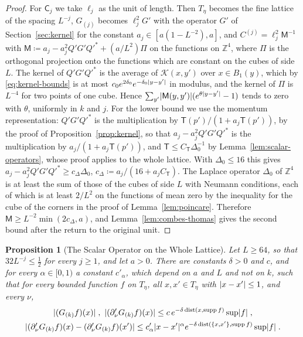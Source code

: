 \documentclass[11pt]{preprint}
\newcommand{\dist}{\operatorname{dist}}
\DeclarePairedDelimiter{\abs}{\lvert}{\rvert}
\numberwithin{equation}{section}
\newtheorem{proposition}[theorem]{Proposition}
\theoremstyle{definition}
\theoremstyle{remark}
\theoremstyle{plain}
\begin{document}
\begin{proof}
For $\mathsf C_j$ we take $\ell_j$ as the unit of length. Then $T_\eta$ becomes the fine lattice of the spacing $L^{-j}$, $G_{(j)}$ becomes $\ell_j^2G'$ with the operator $G'$ of Section~\ref{sec:kernel} for the constant $a_j \in [a(1 - L^{-2}), a]$, and $C^{(j)} = \ell_j^2\mathsf M^{-1}$ with $\mathsf M \coloneqq a_j - a_j^2Q'G'Q'^* + (a/L^2)\Pi$ on the functions on $\mathbb Z^4$, where $\Pi$ is the orthogonal projection onto the functions which are constant on the cubes of side $L$. The kernel of $Q'G'Q'^*$ is the average of $\mathcal K(x, y')$ over $x \in B_1(y)$, which by \eqref{eq:kernel-bounds} is at most $c_0e^{2\delta_0}e^{-\delta_0\abs{y - y'}}$ in modulus, and the kernel of $\Pi$ is $L^{-4}$ for two points of one cube. Hence $\sum_{y'}\abs{\mathsf M(y, y')}(e^{\theta\abs{y - y'}} - 1)$ tends to zero with $\theta$, uniformly in $k$ and $j$. For the lower bound we use the momentum representation: $Q'G'Q'^*$ is the multiplication by $\mathsf T(p')/(1 + a_j\mathsf T(p'))$, by the proof of Proposition~\ref{prop:kernel}, so that $a_j - a_j^2Q'G'Q'^*$ is the multiplication by $a_j/(1 + a_j\mathsf T(p'))$, and $\mathsf T \leq C_{\mathsf T}\Delta_0^{-1}$ by Lemma~\ref{lem:scalar-operators}, whose proof applies to the whole lattice. With $\Delta_0 \leq 16$ this gives $a_j - a_j^2Q'G'Q'^* \geq c_\Delta\Delta_0$, $c_\Delta \coloneqq a_j/(16 + a_jC_{\mathsf T})$. The Laplace operator $\Delta_0$ of $\mathbb Z^4$ is at least the sum of those of the cubes of side $L$ with Neumann conditions, each of which is at least $2/L^2$ on the functions of mean zero by the inequality for the cube of the corners in the proof of Lemma~\ref{lem:poincare}. Therefore $\mathsf M \geq L^{-2}\min(2c_\Delta, a)$, and Lemma~\ref{lem:combes-thomas} gives the second bound after the return to the original unit.
\end{proof}

\begin{proposition}[The Scalar Operator on the Whole Lattice]\label{prop:scalar-sup}
Let $L \geq 64$, so that $32L^{-j} \leq \frac12$ for every $j \geq 1$, and let $a > 0$. There are constants $\delta > 0$ and $c$, and for every $\alpha \in [0, 1)$ a constant $c'_\alpha$, which depend on $a$ and $L$ and not on $k$, such that for every bounded function $f$ on $T_\eta$, all $x, x' \in T_\eta$ with $\abs{x - x'} \leq 1$, and every $\nu$,
\begin{equation}\label{eq:scalar-sup}
\begin{gathered}
    \abs{(G_{(k)}f)(x)}\;,\ \abs{(\partial'_\nu G_{(k)}f)(x)} \leq c\,e^{-\delta\dist(x, \operatorname{supp}f)}\sup\abs f\;,\\
    \abs{(\partial'_\nu G_{(k)}f)(x) - (\partial'_\nu G_{(k)}f)(x')} \leq c'_\alpha\abs{x - x'}^\alpha e^{-\delta\dist(\{ x, x' \}, \operatorname{supp}f)}\sup\abs f\;.
\end{gathered}
\end{equation}
\end{proposition}
\end{document}
